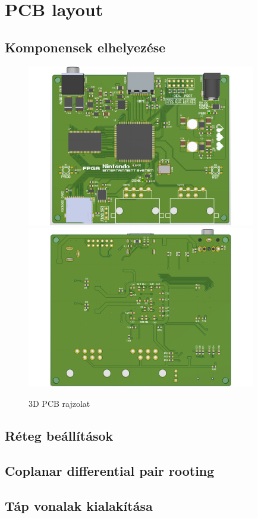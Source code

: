 \section{PCB layout}
	\subsection{Komponensek elhelyezése}
	\begin{figure}[H]
		\centering
		\includegraphics[width=100mm, keepaspectratio, angle=90]{figures/Top}
		\includegraphics[width=100mm, keepaspectratio, angle=90]{figures/Bottom}\\\vspace{5mm}
		\caption{3D PCB rajzolat} 
		\label{fig:PCB-3D}
	\end{figure}
	\subsection{Réteg beállítások}
	
	\subsection{Coplanar differential pair rooting}
	
	\subsection{Táp vonalak kialakítása}
	
	
	
	

